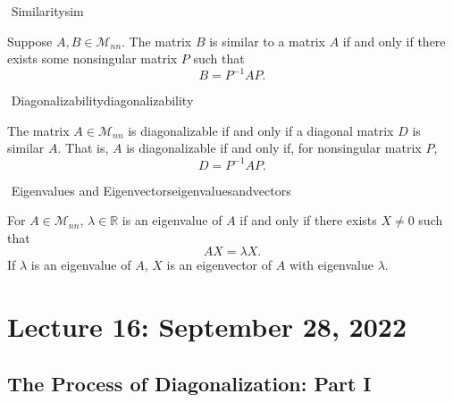        \begin{definition}{\Stop\,\,Similarity}{sim}

            Suppose \(A,B\in\mathcal{M}_{nn}\). The matrix \(B\) is similar to a matrix \(A\) if and only if there exists some nonsingular matrix \(P\) such that
            \begin{equation*}
                B=P^{-1}AP.
            \end{equation*}

        \end{definition}
        \begin{definition}{\Stop\,\,Diagonalizability}{diagonalizability}

            The matrix \(A\in\mathcal{M}_{nn}\) is diagonalizable if and only if a diagonal matrix \(D\) is similar \(A\). That is, \(A\) is diagonalizable if and only if, for nonsingular matrix \(P\),
            \begin{equation*}
                D=P^{-1}AP.
            \end{equation*}
            
        \end{definition}
        \begin{definition}{\Stop\,\,Eigenvalues and Eigenvectors}{eigenvaluesandvectors}

            For \(A\in\mathcal{M}_{nn}\), \(\lambda\in\mathbb{R}\) is an eigenvalue of \(A\) if and only if there exists \(X\neq0\) such that
            \begin{equation*}
                AX=\lambda X.
            \end{equation*}
            If \(\lambda\) is an eigenvalue of \(A\), \(X\) is an eigenvector of \(A\) with eigenvalue \(\lambda\).

        \end{definition}

        \pagebreak

\section{Lecture 16: September 28, 2022}

    \subsection{The Process of Diagonalization: Part I}

